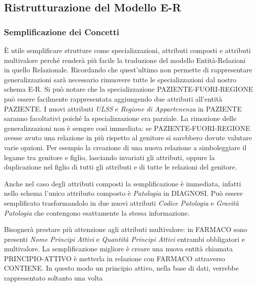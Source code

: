 \documentclass{article}
\begin{document}
\subsection{Ristrutturazione del Modello E-R}
\subsubsection{Semplificazione dei Concetti}

È utile semplificare strutture come specializzazioni, attributi composti e attributi multivalore perché renderà più facile la traduzione del modello Entità-Relazioni in quello Relazionale.
Ricordando che quest'ultimo non permette di rappresentare generalizzazioni sarà necessario rimuovere tutte le specializzazioni dal nostro schema E-R.
Si può notare che la specializzazione PAZIENTE-FUORI-REGIONE può essere facilmente rappresentata aggiungendo due attributi all'entità PAZIENTE.
I nuovi attributi \textit{ULSS} e \textit{Regione di Appartenenza} in PAZIENTE saranno facoltativi poiché la specializzazione era parziale.
La rimozione delle generalizzazioni non è sempre così immediata: se PAZIENTE-FUORI-REGIONE avesse avuto una relazione in più rispetto al genitore si sarebbero dovute valutare varie opzioni.
Per esempio la creazione di una nuova relazione a simboleggiare il legame tra genitore e figlio, lasciando invariati gli attributi, oppure la duplicazione nel figlio di tutti gli attributi e di tutte le relazioni del genitore.

Anche nel caso degli attributi composti la semplificazione è immediata, infatti nello schema l'unico attributo composto è \textit{Patologia} in DIAGNOSI.
Può essere semplificato trasformandolo in due nuovi attributi \textit{Codice Patologia} e \textit{Gravità Patologia} che contengono esattamente la stessa informazione.

Bisognerà prestare più attenzione agli attributi multivalore: in FARMACO sono presenti \textit{Nome Principi Attivi} e \textit{Quantità Principi Attivi} entrambi obbligatori e multivalore.
La semplificazione migliore è creare una nuova entità chiamata PRINCIPIO-ATTIVO è metterla in relazione con FARMACO attraverso CONTIENE.
In questo modo un principio attivo, nella base di dati, verrebbe rappresentato soltanto una volta
\end{document}
